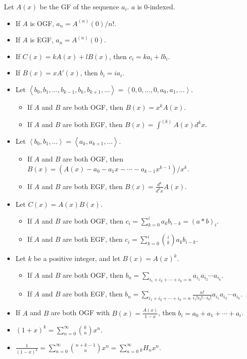 Let $A(x)$ be the GF of the sequence $a_i$. $a$ is $0$-indexed.
\begin{itemize}
	\item If $A$ is OGF, $a_n = A^{(n)}(0)/n!$.
	\item If $A$ is EGF, $a_n = A^{(n)}(0)$.
	\item If $C(x) = k A(x) + l B(x)$, then $c_i = k a_i + l b_i$.
	\item If $B(x) = x A'(x)$, then $b_i = i a_i$.
	\item Let $\left< b_0, b_1, \ldots, b_{k-1}, b_k, b_{k+1}, \ldots \right> = \left< 0, 0, \ldots, 0, a_0, a_1, \ldots \right>$.
	\begin{itemize}
		\item If $A$ and $B$ are both OGF, then $B(x) = x^k A(x)$.
		\item If $A$ and $B$ are both EGF, then $B(x) = \int^{(k)} A(x) d^kx$.
	\end{itemize}
	\item Let $\left< b_0, b_1, \ldots \right> = \left< a_k, a_{k+1}, \ldots \right>$.
	\begin{itemize}
		\item If $A$ and $B$ are both OGF, then $B(x) = (A(x) - a_0 - a_1 x - \cdots - a_{k-1} x^{k-1})/x^k$.
		\item If $A$ and $B$ are both EGF, then $B(x) = \frac{d^k}{d^kx} A(x)$.
	\end{itemize}
	\item Let $C(x) = A(x) B(x)$.
	\begin{itemize}
		\item If $A$ and $B$ are both OGF, then $c_i = \sum_{k=0}^{i} a_k b_{i-k} = (a*b)_i$.
		\item If $A$ and $B$ are both EGF, then $c_i = \sum_{k=0}^{i} \binom{i}{k} a_k b_{i-k}$.
	\end{itemize}
	\item Let $k$ be a positive integer, and let $B(x) = A(x)^k$.
	\begin{itemize}
		\item If $A$ and $B$ are both OGF, then $b_n = \sum_{i_1 + i_2 + \cdots + i_k = n} a_{i_1} a_{i_2} \cdots a_{i_k}$.
		\item If $A$ and $B$ are both EGF, then $b_n = \sum_{i_1 + i_2 + \cdots + i_k = n} \frac{n!}{i_1! i_2! \cdots i_k!} a_{i_1} a_{i_2} \cdots a_{i_k}$.
	\end{itemize}
	\item If $A$ and $B$ are both OGF with $B(x) = \frac{A(x)}{1-x}$, then $b_i = a_0 + a_1 + \cdots + a_i$.
	\item $(1+x)^k = \sum_{n=0}^{\infty} \binom{k}{n} x^n$.
	\item $\frac{1}{(1-x)^k} = \sum_{n=0}^{\infty} \binom{n+k-1}{n} x^n = \sum_{n=0}^{\infty} {}_{k}H_{n} x^n$.
\end{itemize}